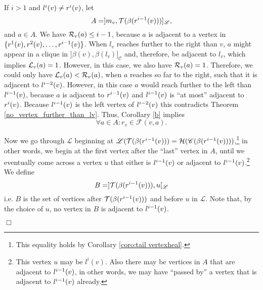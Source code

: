 \documentclass[10pt]{article}
\newenvironment{proof}{\noindent{\bf Proof~}}{\null\hfill $\Box$\par\medskip}
\newcommand{\q}[1]{``#1''}\newcommand{\fu}[1]{\mathcal{#1}}\newcommand{\mc}[1]{\mathsf{#1}}\newcommand{\ri}[1]{\mathscr{#1}}\newcommand{\co}[1]{\fu{C}({#1})}\newcommand{\lc}[1]{\alpha(#1)}\newcommand{\rc}[1]{\beta(#1)}\newcommand{\ema}[1]{\mathcal{#1}}\newcommand{\fe}[2]{\fu{F}(#1,#2)}\newcommand{\lv}[1]{l_{#1}}\newcommand{\rv}[1]{r_{#1}}\newcommand{\mv}[1]{m_{#1}}\newcommand{\lvv}{\lv{v}}
\newcommand{\rvv}{\rv{v}}
\newcommand{\mvv}{\mv{v}}
\begin{document}
\begin{proof}
If $i>1$ and $\lvi{v}{i}\neq\rvi{v}{i}$, let
$$A=]\mvv,\last{\rc{r^{i-1}(v)}}]_\ri{L},$$
and $a\in A$.
We have $\rvd{a}\leq i-1$, because $a$ is adjacent to a vertex 
in $\{\rvi{v}{1},\rvi{v}{2},\ldots,\rvi{v}{i-1}\}$.
When $\lvv$ reaches further to the right than $v$, $a$ might appear in a clique in $]\rc{v},\rc{\lvv}]_\ri{C}$ and, therefore, be adjacent to $\lvv$, which implies $\lvd{a} = 1$.
However, in this case, we also have $\rvd{a} = 1$. Therefore, we could only have $\lvd{a} <  \rvd{a}$, when $a$ reaches so far to the right, such that it is adjacent to $\lvi{v}{i-2}$.
However, in this case $a$ would reach further to the left than $\lvi{v}{i-1}$, because $a$ is adjacent to $\rvi{v}{i-1}$ and $\lvi{v}{i-1}$ is \q{at most} adjacent to $\rvi{v}{i}$.
Because $\lvi{v}{i-1}$ is the left vertex of $\lvi{v}{i-2}$ this contradicts Theorem \ref{no_vertex_further_than_lv}.
Thus, Corollary \ref{b} implies 
\begin{equation}\label{eqd}
\forall a\in A\colon\rvv\in \fe{v}{a}.
\end{equation}


Now we go through $\ri{L}$ beginning at 
$\ri{L}(\last{\rc{\rvi{v}{i-1}}}=\first{\ri{C}(\rc{\rvi{v}{i-1}})}$,\footnote{This 
equality holds by Corollary \ref{coro:tail vertexheal}.} in other 
words, we begin at the first vertex after the \q{last} vertex in  $A$, until we 
eventually come across a vertex $u$ that either is $\lvi{v}{i-1}$ or adjacent 
to $\lvi{v}{i-1}$.\footnote{This vertex 
$u$ may be $l^i(v)$. Also there may be vertices in $A$ that are adjacent to 
$\lvi{v}{i-1}$, in other words, we may have \q{passed by} a vertex that is 
adjacent to $\lvi{v}{i-1}$ already.}
We define
$$B=
]\last{\rc{\rvi{v}{i-1}}},u[_\ri{L}
$$
i.e. $B$ is the set of vertices after $\last{\rc{\rvi{v}{i-1}}}$ and before $u$ in $\ri{L}$.
Note that, by the choice of $u$, no vertex in $B$ is adjacent to $\lvi{v}{i-1}$.


\end{proof}
\end{document}
